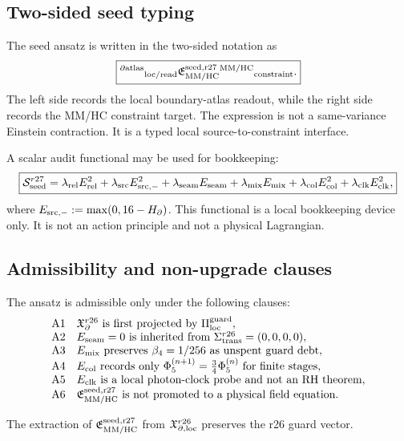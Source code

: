 \subsection{Two-sided seed typing}
\label{subsec:v470-r27-two-sided-seed-typing}

The seed ansatz is written in the two-sided notation as
\[
\boxed{
{}^{\partial\rm atlas}{}_{\rm loc/read}
\mathfrak E_{\rm MM/HC}^{\rm seed,r27}
{}^{\rm MM/HC}{}_{\rm constraint}.
}
\]
The left side records the local boundary-atlas readout, while the right side
records the MM/HC constraint target.  The expression is not a same-variance
Einstein contraction.  It is a typed local source-to-constraint interface.

A scalar audit functional may be used for bookkeeping:
\[
\boxed{
\mathcal S_{\rm seed}^{r27}
=
\lambda_{\rm rel}E_{\rm rel}^2
+\lambda_{\rm src}E_{\rm src,-}^2
+\lambda_{\rm seam}E_{\rm seam}
+\lambda_{\rm mix}E_{\rm mix}
+\lambda_{\rm col}E_{\rm col}^2
+\lambda_{\rm clk}E_{\rm clk}^2,
}
\]
where \(E_{\rm src,-}:=\max(0,16-H_{\partial})\).  This functional is a local
bookkeeping device only.  It is not an action principle and not a physical
Lagrangian.

\subsection{Admissibility and non-upgrade clauses}
\label{subsec:v470-r27-admissibility-nonupgrade}

The ansatz is admissible only under the following clauses:
\[
\begin{array}{ll}
\mathrm{A1} & \mathfrak X_{\partial}^{r26}\text{ is first projected by }\Pi_{\rm loc}^{\rm guard},\\
\mathrm{A2} & E_{\rm seam}=0\text{ is inherited from }\Sigma_{\rm trans}^{r26}=(0,0,0,0),\\
\mathrm{A3} & E_{\rm mix}\text{ preserves }\beta_4=1/256\text{ as unspent guard debt},\\
\mathrm{A4} & E_{\rm col}\text{ records only }\Phi_5^{(n+1)}=\frac34\Phi_5^{(n)}\text{ for finite stages},\\
\mathrm{A5} & E_{\rm clk}\text{ is a local photon-clock probe and not an RH theorem},\\
\mathrm{A6} & \mathfrak E_{\rm MM/HC}^{\rm seed,r27}\text{ is not promoted to a physical field equation.}
\end{array}
\]

\begin{lemma}
\label{lem:v470-r27-seed-extraction-preserves-guards}
The extraction of \(\mathfrak E_{\rm MM/HC}^{\rm seed,r27}\) from
\(\mathfrak X_{\partial,\rm loc}^{r26}\) preserves the r26 guard vector.
\end{lemma}

